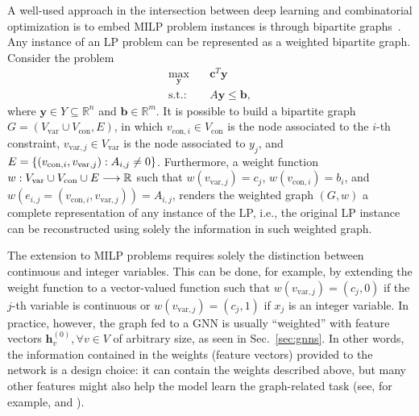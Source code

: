 A well-used approach in the intersection between deep learning and combinatorial optimization is to embed MILP problem instances is through bipartite graphs~\cite{gasseExactCombinatorialOptimization2019,nairSolvingMixedInteger2021,dingAcceleratingPrimalSolution2020,khalilMIPGNNDataDrivenFramework2022,hanGNNGuidedPredictandSearchFramework2023}.
Any instance of an LP problem can be represented as a weighted bipartite graph.
Consider the problem
\begin{equation}\label{eq:example-lp-graph}
\begin{aligned}
    \max_{\bm{y}} & \quad \bm{c}^T \bm{y} \\
    \text{s.t.:} & \quad A\bm{y} \le\bm{b} 
,\end{aligned}
\end{equation}
where $\bm{y}\in Y \subseteq\mathbb{R}^n$ and $\bm{b}\in \mathbb{R}^m$.
It is possible to build a bipartite graph $G=(V_{\textrm{var}}\cup V_{\textrm{con}}, E)$, in which $v_{\textrm{con},i}\in V_{\textrm{con}}$ is the node associated to the $i$-th constraint, $v_{\textrm{var},j}\in V_{\textrm{var}}$ is the node associated to $y_j$, and $E=\{(v_{{\rm con},i},v_{{\rm var},j}) : A_{i,j} \neq 0\}$.
Furthermore, a weight function $w: V_{\textrm{var}}\cup V_\textrm{con}\cup E \longrightarrow \mathbb{R}$ such that $w(v_{\textrm{var},j}) = c_j$, $w(v_{\textrm{con},i}) = b_i$, and $w(e_{i,j}=(v_{\textrm{con},i},v_{\textrm{var},j})) = A_{i,j}$, renders the weighted graph $(G,w)$ a complete representation of any instance of the LP, i.e., the original LP instance can be reconstructed using solely the information in such weighted graph.

The extension to MILP problems requires solely the distinction between continuous and integer variables.
This can be done, for example, by extending the weight function to a vector-valued function such that $w(v_{\textrm{var},j}) = (c_j,0)$ if the $j$-th variable is continuous or $w(v_{\textrm{var},j}) = (c_j,1)$ if $x_j$ is an integer variable.
In practice, however, the graph fed to a GNN is usually ``weighted'' with feature vectors $\bm{h}_v^{(0)}, \forall v\in V$ of arbitrary size, as seen in Sec.~\ref{sec:gnns}.
In other words, the information contained in the weights (feature vectors) provided to the network is a design choice: it can contain the weights described above, but many other features might also help the model learn the graph-related task (see, for example,  and ).

